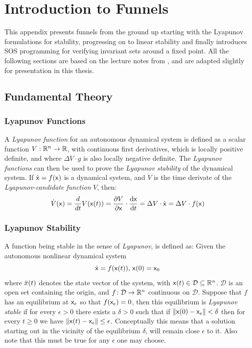 \chapter{Introduction to Funnels}
\label{sec:first-app}

This appendix presents funnels from the ground up starting with the Lyapunov
formulations for stability, progressing on to linear stability and finally
introduces \ac{SOS} programming for verifying invariant sets around a fixed
point. All the following sections are based on the lecture notes from
\cite{tedrakeUnderactuatedRoboticsAlgorithms2019}, and are adapted slightly for
presentation in this thesis.

\section{Fundamental Theory}

\subsection{Lyapunov Functions}

A \textit{Lyapunov function} for an autonomous dynamical system is defined as a
scalar function \(V: \mathbb{R}^n \rightarrow \mathbb{R}\), with continuous first derivatives,
which is locally positive definite, and where \(\Delta V \cdot g\) is also
locally negative definite. The \textit{Lyapunov functions} can then be used to
prove the \textit{Lyapunov stability} of the dynamical system. If
\(\dot{{\mathbf{\mathsf{x}}}} = f({\mathbf{\mathsf{x}}})\) is a dynamical system, and \(\dot{V}\) is the
time derivate of the \textit{Lyapunov-candidate function} \(V\), then:
\[
  \dot{V}({\mathbf{\mathsf{x}}}) = \frac{d}{dt}V({\mathbf{\mathsf{x}}}(t)) = \frac{\partial V}{\partial
    {\mathbf{\mathsf{x}}}} \cdot \frac{\mathrm{d}{\mathbf{\mathsf{x}}}}{\mathrm{d}t} = \Delta V \cdot
  \dot{{\mathbf{\mathsf{x}}}} = \Delta V \cdot f({\mathbf{\mathsf{x}}})
\]

\subsection{Lyapunov Stability}

A function being stable in the sense of \textit{Lyapunov}, is defined as: Given
the autonomous nonlinear dynamical system
\[
  \dot{{\mathbf{\mathsf{x}}}} = f({\mathbf{\mathsf{x}}}(t)), \, {\mathbf{\mathsf{x}}}(0) = {\mathbf{\mathsf{x}}}_0
\]
where \(\bar{x}(t)\) denotes the state vector of the system, with \({\mathbf{\mathsf{x}}}(t) \in
\mathcal{D} \subseteq \mathbb{R}^n\). \(\mathcal{D}\) is an open set containing the
origin, and \(f \colon \mathcal{D} \rightarrow \mathbb{R}^n\) continuous on
\(\mathcal{D}\). Suppose that \(f\) has an equilibrium at \({\mathbf{\mathsf{x}}}_e\) so that
\(f({\mathbf{\mathsf{x}}}_e) = 0\), then this equilibrium is \textit{Lyapunov stable} if for
every \(\epsilon > 0\) there exists a \(\delta > 0\) such that if \(\left \lVert
  {\mathbf{\mathsf{x}}}(0) - {\mathbf{\mathsf{x}}}_e \right \rVert < \delta\) then for every \(t \geq 0\)
we have \( \lVert {\mathbf{\mathsf{x}}}(t) - {\mathbf{\mathsf{x}}}_e \rVert \leq \epsilon\). Conceptually
this means that a solution starting out in the vicinity of the equilibrium
\(\delta\), will remain close \(\epsilon\) to it. Also note that this must be
true for any \(\epsilon\) one may choose.

